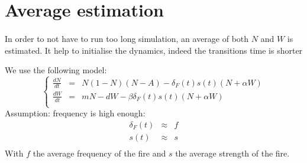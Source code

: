 \documentclass{article}
\begin{document}

\newpage
\section{Average estimation}
\label{average}

\paragraph{}
In order to not have to run too long simulation, an average of both $N$ and $W$ is estimated. It help to initialise the dynamics, indeed the transitions time is shorter

We use the following model:
\[
\left\lbrace
\begin{array}{rcl}
\frac{dN}{dt} & = & N(1-N)(N-A) - \delta_F(t)s(t)(N+\alpha W) \\
\frac{dW}{dt} & = & mN -dW - \beta\delta_F(t)s(t)(N+\alpha W) \\
\end{array}
\right.
\]
Assumption: frequency is high enough: 
\[
\begin{array}{rcl}
\delta_F(t) & \approx & f \\
s(t) & \approx & s \\
\end{array}
\]
With $f$ the average frequency of the fire and $s$ the average strength of the fire.
\end{document}
